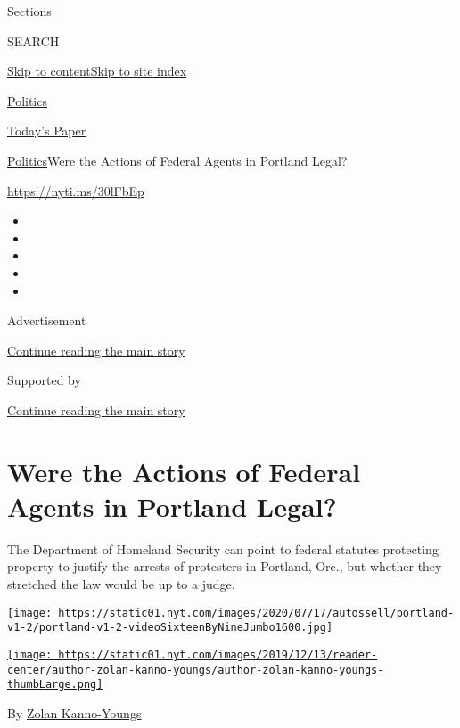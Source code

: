 Sections

SEARCH

\protect\hyperlink{site-content}{Skip to
content}\protect\hyperlink{site-index}{Skip to site index}

\href{https://www.nytimes.com/section/politics}{Politics}

\href{https://myaccount.nytimes.com/auth/login?response_type=cookie\&client_id=vi}{}

\href{https://www.nytimes.com/section/todayspaper}{Today's Paper}

\href{/section/politics}{Politics}\textbar{}Were the Actions of Federal
Agents in Portland Legal?

\url{https://nyti.ms/30lFbEp}

\begin{itemize}
\item
\item
\item
\item
\item
\end{itemize}

Advertisement

\protect\hyperlink{after-top}{Continue reading the main story}

Supported by

\protect\hyperlink{after-sponsor}{Continue reading the main story}

\hypertarget{were-the-actions-of-federal-agents-in-portland-legal}{%
\section{Were the Actions of Federal Agents in Portland
Legal?}\label{were-the-actions-of-federal-agents-in-portland-legal}}

The Department of Homeland Security can point to federal statutes
protecting property to justify the arrests of protesters in Portland,
Ore., but whether they stretched the law would be up to a judge.

\texttt{[image: https://static01.nyt.com/images/2020/07/17/autossell/portland-v1-2/portland-v1-2-videoSixteenByNineJumbo1600.jpg]}

\href{https://www.nytimes.com/by/zolan-kanno-youngs}{\texttt{[image: https://static01.nyt.com/images/2019/12/13/reader-center/author-zolan-kanno-youngs/author-zolan-kanno-youngs-thumbLarge.png]}}

By \href{https://www.nytimes.com/by/zolan-kanno-youngs}{Zolan
Kanno-Youngs}

